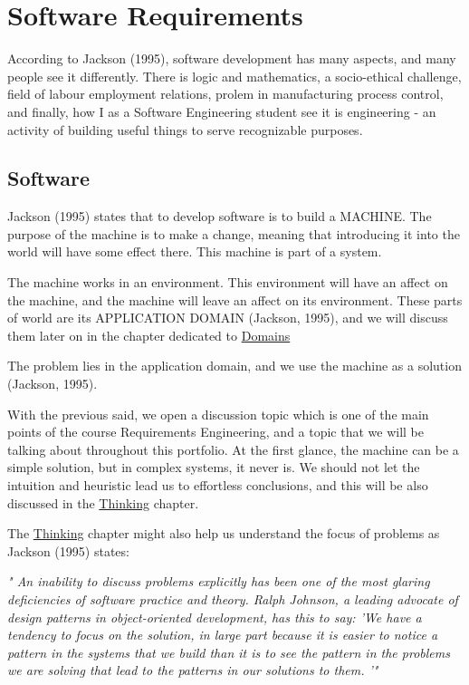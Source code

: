 \documentclass{article}
\begin{document}
\section{Software Requirements}

According to Jackson (1995), software development has many aspects, and many people see it differently. There is logic and mathematics, a socio-ethical challenge, field of labour employment relations, prolem in manufacturing process control, and finally, how I as a Software Engineering student see it is engineering - an activity of building useful things to serve recognizable purposes.

\subsection{Software}
Jackson (1995) states that to develop software is to build a MACHINE. The purpose of the machine is to make a change, meaning that introducing it into the world will have some effect there. This machine is part of a system.

The machine works in an environment. This environment will have an affect on the machine, and the machine will leave an affect on its environment. These parts of world are its APPLICATION DOMAIN (Jackson, 1995), and we will discuss them later on in the chapter dedicated to \hyperref[sec:domains]{Domains}

The problem lies in the application domain, and we use the machine as a solution (Jackson, 1995). 

With the previous said, we open a discussion topic which is one of the main points of the course Requirements Engineering, and a topic that we will be talking about throughout this portfolio. At the first glance, the machine can be a simple solution, but in complex systems, it never is. We should not let the intuition and heuristic lead us to effortless conclusions, and this will be also discussed in the \hyperref[sec:thinking]{Thinking} chapter.

The \hyperref[sec:thinking]{Thinking} chapter might also help us understand the focus of problems as Jackson (1995) states:

\textit{"  An inability to discuss problems explicitly has been one of the most glaring deficiencies of software practice and theory.
  Ralph Johnson, a leading advocate of design patterns in object-oriented development, has this to say:  'We have a tendency to focus on the solution, in large part because it is easier to notice a pattern in the systems that we build than it is to see the pattern in the problems we are solving that lead to the patterns in our solutions to them. '"}
\end{document}
